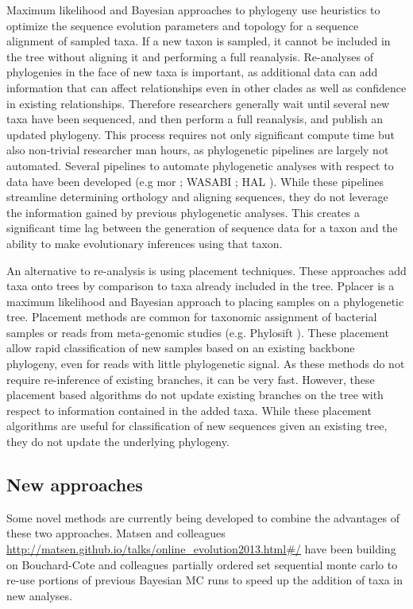\documentclass[10pt]{article}
\begin{document}
Maximum likelihood and Bayesian approaches to phylogeny use heuristics to optimize the sequence evolution parameters and topology for a sequence alignment of sampled taxa. 
If a new taxon is sampled, it cannot be included in the tree without aligning it and performing a full reanalysis. 
 Re-analyses of phylogenies in the face of new taxa is important, as additional data can add information that can affect relationships even in other clades as well as confidence in existing relationships. 
Therefore researchers generally wait until several new taxa have been sequenced, and then perform a full reanalysis, and publish an updated phylogeny. 
This process requires not only significant compute time but also non-trivial researcher man hours, as phylogenetic pipelines are largely not automated. 
Several pipelines to automate phylogenetic analyses with respect to data have been developed (e.g mor \cite{hibbett_automated_2005}; WASABI \cite{kauff_WASABI:_2007}; HAL \cite{robbertse_hal:_2011}). 
While these pipelines streamline determining orthology and aligning sequences, they do not leverage the information gained by previous phylogenetic analyses. 
This creates a significant time lag between the generation of sequence data for a taxon and the ability to make evolutionary inferences using that taxon.

An alternative to re-analysis is using placement techniques. 
These approaches add taxa onto trees by comparison to taxa already included in the tree. 
Pplacer \cite{matsen_pplacer:_2010} is a maximum likelihood and Bayesian approach to placing samples on a phylogenetic tree. 
Placement methods are common for taxonomic assignment of bacterial samples or reads from meta-genomic studies (e.g. 
Phylosift \cite{darling_phylosift:_2014}). 
These placement allow rapid classification of new samples based on an existing backbone phylogeny, even for reads with little phylogenetic signal. 
As these methods do not require re-inference of existing branches, it can be very fast. 
However, these placement based algorithms do not update existing branches on the tree with respect to information contained in the added taxa. 
While these placement algorithms are useful for classification of new sequences given an existing tree, they do not update the underlying phylogeny.

\subsection*{New approaches}
Some novel methods are currently being developed to combine the advantages of these two approaches. 
Matsen and colleagues \url{http://matsen.github.io/talks/online_evolution2013.html#/} have been building on Bouchard-Cote and colleagues partially ordered set sequential monte carlo \cite{bouchard-cote_phylogenetic_2012} to re-use portions of previous Bayesian MC runs to speed up the addition of taxa in new analyses.
\end{document}
